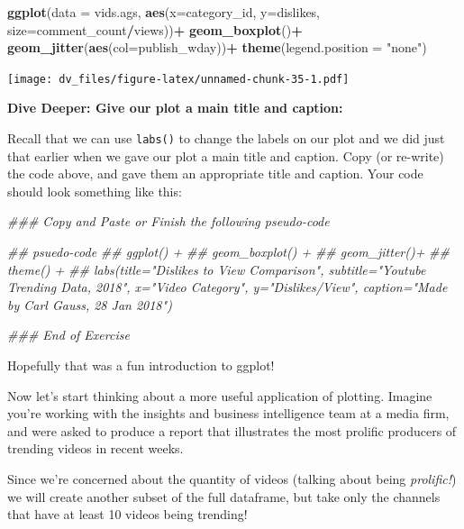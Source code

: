 \documentclass[]{article}
\newenvironment{Shaded}{\begin{snugshade}}{\end{snugshade}}
\newcommand{\CommentTok}[1]{\textcolor[rgb]{0.56,0.35,0.01}{\textit{#1}}}
\newcommand{\DataTypeTok}[1]{\textcolor[rgb]{0.13,0.29,0.53}{#1}}
\newcommand{\KeywordTok}[1]{\textcolor[rgb]{0.13,0.29,0.53}{\textbf{#1}}}
\newcommand{\NormalTok}[1]{#1}
\newcommand{\OperatorTok}[1]{\textcolor[rgb]{0.81,0.36,0.00}{\textbf{#1}}}
\newcommand{\StringTok}[1]{\textcolor[rgb]{0.31,0.60,0.02}{#1}}
\begin{document}
\begin{Shaded}
\begin{Highlighting}[]
\KeywordTok{ggplot}\NormalTok{(}\DataTypeTok{data =}\NormalTok{ vids.ags, }\KeywordTok{aes}\NormalTok{(}\DataTypeTok{x=}\NormalTok{category_id, }\DataTypeTok{y=}\NormalTok{dislikes, }\DataTypeTok{size=}\NormalTok{comment_count}\OperatorTok{/}\NormalTok{views))}\OperatorTok{+}
\StringTok{  }\KeywordTok{geom_boxplot}\NormalTok{()}\OperatorTok{+}
\StringTok{  }\KeywordTok{geom_jitter}\NormalTok{(}\KeywordTok{aes}\NormalTok{(}\DataTypeTok{col=}\NormalTok{publish_wday))}\OperatorTok{+}
\StringTok{  }\KeywordTok{theme}\NormalTok{(}\DataTypeTok{legend.position =} \StringTok{"none"}\NormalTok{)}
\end{Highlighting}
\end{Shaded}

\texttt{[image: dv\_files/figure-latex/unnamed-chunk-35-1.pdf]}

\textbf{Dive Deeper: Give our plot a main title and caption:}

Recall that we can use \texttt{labs()} to change the labels on our plot
and we did just that earlier when we gave our plot a main title and
caption. Copy (or re-write) the code above, and gave them an appropriate
title and caption. Your code should look something like this:

\begin{Shaded}
\begin{Highlighting}[]
\CommentTok{### Copy and Paste or Finish the following pseudo-code}

\CommentTok{## psuedo-code}
\CommentTok{## ggplot() +}
\CommentTok{##   geom_boxplot() +}
\CommentTok{##   geom_jitter()+}
\CommentTok{##   theme() +}
\CommentTok{##   labs(title="Dislikes to View Comparison", subtitle="Youtube Trending Data, 2018", x="Video Category",       y="Dislikes/View", caption="Made by Carl Gauss, 28 Jan 2018")}

\CommentTok{### End of Exercise}
\end{Highlighting}
\end{Shaded}

Hopefully that was a fun introduction to ggplot!

Now let's start thinking about a more useful application of plotting.
Imagine you're working with the insights and business intelligence team
at a media firm, and were asked to produce a report that illustrates the
most prolific producers of trending videos in recent weeks.

Since we're concerned about the quantity of videos (talking about being
\emph{prolific!}) we will create another subset of the full dataframe,
but take only the channels that have at least 10 videos being trending!
\end{document}
